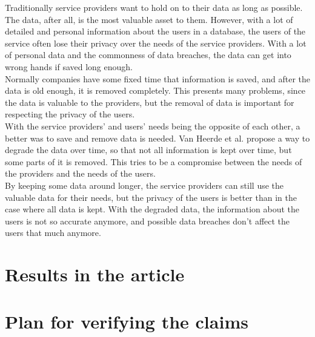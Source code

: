 \documentclass[a4paper,12pt,oneside,fleqn]{article}
\begin{document}
Traditionally service providers want to hold on to their data as long
as possible. The data, after all, is the most valuable asset to
them. However, with a lot of detailed and personal information about
the users in a database, the users of the service often lose their
privacy over the needs of the service providers. With a lot of
personal data and the commonness of data breaches, the data can get
into wrong hands if saved long enough.\\

Normally companies have some fixed time that information is saved, and
after the data is old enough, it is removed completely. This presents
many problems, since the data is valuable to the providers, but the
removal of data is important for respecting the privacy of the
users.\\

With the service providers' and users' needs being the opposite of
each other, a better was to save and remove data is needed. Van Heerde
et al. propose a way to degrade the data over time, so that not all
information is kept over time, but some parts of it is removed. This
tries to be a compromise between the needs of the providers and the
needs of the users.\\

By keeping some data around longer, the service providers can still
use the valuable data for their needs, but the privacy of the users is
better than in the case where all data is kept. With the degraded
data, the information about the users is not so accurate anymore, and
possible data breaches don't affect the users that much anymore.

\section{Results in the article}



\section{Plan for verifying the claims}
\end{document}
